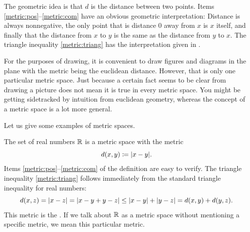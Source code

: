 The geometric idea is that $d$ is the distance between two points. 
Items \ref{metric:pos}--\ref{metric:com} have an obvious geometric
interpretation: Distance is always nonnegative, the only point that is
distance 0 away from $x$ is $x$ itself, and finally that the distance from
$x$ to $y$ is the same as the distance from $y$ to $x$.  The triangle
inequality \ref{metric:triang} has the interpretation given in
.
\begin{myfigureht}
\caption{Diagram of the triangle inequality in metric spaces.\label{fig:mstriang}}
\end{myfigureht}

For the purposes of drawing, it is convenient to draw figures and
diagrams in the plane with the metric being the euclidean distance.
However, that is only one particular metric space.  Just because a
certain fact seems to be clear from drawing a picture does not mean it is
true in every metric space.
You might be getting sidetracked by intuition from euclidean geometry,
whereas the concept of a metric space is a lot more general.

Let us give some examples of metric spaces.

\begin{example}
The set of real numbers ${\mathbb{R}}$ is a metric space with the metric
\begin{equation*}
d(x,y) \coloneqq \lvert {x-y} \rvert .
\end{equation*}
Items \ref{metric:pos}--\ref{metric:com} of the definition
are easy to verify.  The
triangle inequality \ref{metric:triang} follows immediately
from the standard triangle inequality for real numbers:
\begin{equation*}
d(x,z) = \lvert {x-z} \rvert = 
\lvert {x-y+y-z} \rvert \leq
\lvert {x-y} \rvert+\lvert {y-z} \rvert =
d(x,y)+ d(y,z) .
\end{equation*}
This metric is the \emph{}.  If we talk
about ${\mathbb{R}}$ as a metric space without mentioning a specific metric, we 
mean this particular metric.
\end{example}

